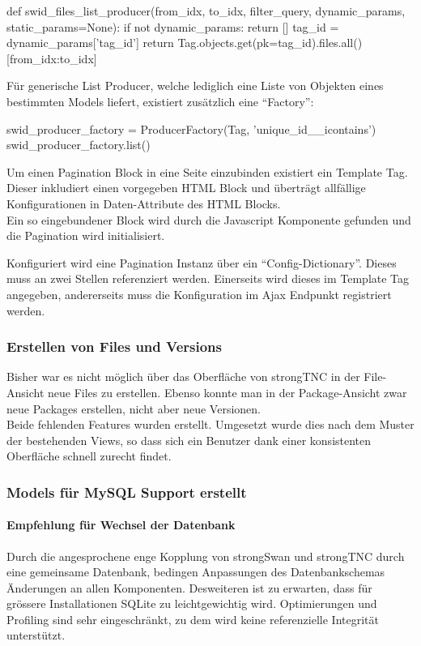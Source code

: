 \begin{pythoncode}
def swid_files_list_producer(from_idx, to_idx, filter_query, dynamic_params, static_params=None):
    if not dynamic_params:
        return []
    tag_id = dynamic_params['tag_id']
    return Tag.objects.get(pk=tag_id).files.all()[from_idx:to_idx]
\end{pythoncode}

Für generische List Producer, welche lediglich eine Liste von Objekten eines
bestimmten Models liefert, existiert zusätzlich eine \enquote{Factory}:

\begin{pythoncode}
swid_producer_factory = ProducerFactory(Tag, 'unique_id__icontains')
swid_producer_factory.list()
\end{pythoncode}

Um einen Pagination Block in eine Seite einzubinden existiert ein Template Tag.
Dieser inkludiert einen vorgegeben HTML Block und überträgt allfällige
Konfigurationen in Daten-Attribute des HTML Blocks.\\
Ein so eingebundener Block wird durch die Javascript Komponente gefunden und die
Pagination wird initialisiert.

Konfiguriert wird eine Pagination Instanz über ein \enquote{Config-Dictionary}.
Dieses muss an zwei Stellen referenziert werden. Einerseits wird dieses im
Template Tag angegeben, andererseits muss die Konfiguration im Ajax Endpunkt
registriert werden.

\subsubsection{Erstellen von Files und Versions}
Bisher war es nicht möglich über das Oberfläche von strongTNC in der
File-Ansicht neue Files zu erstellen. Ebenso konnte man in der Package-Ansicht
zwar neue Packages erstellen, nicht aber neue Versionen.\\
Beide fehlenden Features wurden erstellt. Umgesetzt wurde dies nach dem Muster
der bestehenden Views, so dass sich ein Benutzer dank einer konsistenten
Oberfläche schnell zurecht findet.

\subsubsection{Models für MySQL Support erstellt}
\paragraph{Empfehlung für Wechsel der Datenbank}
Durch die angesprochene enge Kopplung von strongSwan und strongTNC durch eine gemeinsame Datenbank, bedingen Anpassungen des Datenbankschemas Änderungen an allen Komponenten.
Desweiteren ist zu erwarten, dass für grössere Installationen SQLite zu leichtgewichtig wird.
Optimierungen und Profiling sind sehr eingeschränkt, zu dem wird keine referenzielle Integrität unterstützt.
